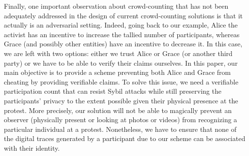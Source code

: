 Finally, one important observation about crowd-counting that has not been adequately addressed in the design of current crowd-counting solutions is that it actually is an adversarial setting. 
Indeed, going back to our example, Alice the activist has an incentive to increase the tallied number of participants, whereas Grace (and possibly other entities) have an incentive to decrease it.
In this case, we are left with two options: either we trust Alice or Grace (or another third party) or we have to be able to verify their claims ourselves.
In this paper, our main objective is to provide a scheme preventing both Alice 
and Grace from cheating by providing verifiable claims.
To solve this issue, we need a verifiable participation count that can resist Sybil attacks while still preserving the participants' privacy to the extent possible given their physical presence at the protest. 
More precisely, our solution will not be able to magically prevent an observer (physically present or looking at photos or videos) from recognizing a particular individual at a protest. 
Nonetheless, we have to ensure that none of the digital traces generated by a participant due to our scheme can be associated with their identity. %




